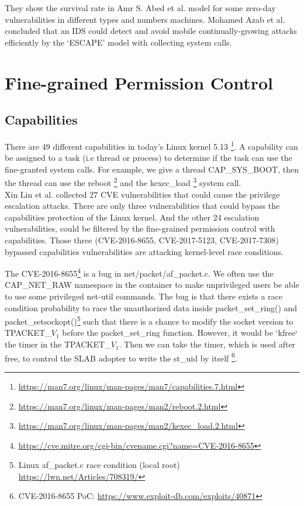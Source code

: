 They show the survival rate in Amr S. Abed et al.\cite{inproceedings} model for some
zero-day vulnerabilities in different types and numbers machines. Mohamed Azab et al.
\cite{7809699,7796855} concluded that an IDS could detect and avoid mobile continually-growing
attacks efficiently by the `ESCAPE' model with collecting system calls.\\

\section{Fine-grained Permission Control}
\subsection{Capabilities}

There are 49 different capabilities in today's Linux kernel 5.13
\footnote{\url{https://man7.org/linux/man-pages/man7/capabilities.7.html}}. A capability can be
assigned to a task (i.e thread or process) to determine if the task can use the fine-granted
system calls. For example, we give a thread CAP\_SYS\_BOOT, then the thread can use the
reboot \footnote{\url{https://man7.org/linux/man-pages/man2/reboot.2.html}} and the
kexec\_load \footnote{\url{https://man7.org/linux/man-pages/man2/kexec\_load.2.html}} system call.\\

Xin Lin et al.\cite{10.1145/3274694.3274720} collected 27 CVE vulnerabilities that could cause
the privilege escalation attacks. There are only three vulnerabilities that could bypass the
capabilities protection of the Linux kernel. And the other 24 escalation vulnerabilities, could
be filtered by the fine-grained permission control with capabilities. Those three (CVE-2016-8655,
CVE-2017-5123, CVE-2017-7308) bypassed capabilities vulnerabilities are attacking kernel-level
race conditions.

The CVE-2016-8655\footnote{\url{https://cve.mitre.org/cgi-bin/cvename.cgi?name=CVE-2016-8655}}
is a bug in net/packet/af\_packet.c. We often use the CAP\_NET\_RAW namespace in the container
to make unprivileged users be able to use some privileged net-util commands. The bug is that
there exists a race condition probability to race the unauthorized data inside packet\_set\_ring()
and packet\_setsockopt()\footnote{Linux af\_packet.c race condition (local root) \url{https://lwn.net/Articles/708319/}}
such that  there is a chance to modify the socket version to TPACKET\_$V_1$ before the
packet\_set\_ring function. However, it would be ‘kfree‘ the timer in the TPACKET\_$V_1$.
Then we can take the timer, which  is used after free, to control the SLAB adopter to write
the st\_uid by itself \footnote{CVE-2016-8655 PoC: \url{https://www.exploit-db.com/exploits/40871}}.

